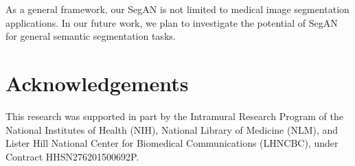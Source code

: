 \documentclass[twocolumn]{svjour3}
\begin{document}
As a general framework, our SegAN is not limited to medical image segmentation applications. In our future work, we plan to investigate the potential of SegAN for general semantic segmentation tasks.


\section{Acknowledgements}
This research was supported in part by the Intramural Research Program of the National Institutes of Health (NIH), National Library of Medicine (NLM), and Lister Hill National Center for Biomedical Communications (LHNCBC), under Contract HHSN276201500692P.

 
\end{document}
